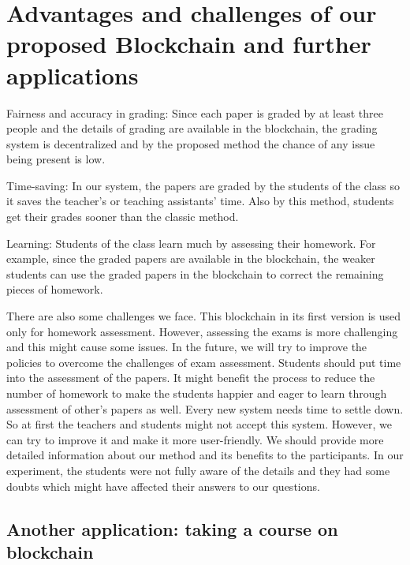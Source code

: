 \documentclass[manuscript,review,anonymous]{acmart}%
\begin{document}
\section{Advantages and challenges of our proposed Blockchain and further applications}

Fairness and accuracy in grading: Since each paper is graded by at least three people and the details of grading are available in the blockchain, the grading system is decentralized and by the proposed method the chance of any issue being present is low.

Time-saving: In our system, the papers are graded by the students of the class so it saves the teacher's or teaching assistants' time. Also by this method, students get their grades sooner than the classic method. 

Learning: Students of the class learn much by assessing their homework. For example, since the graded papers are available in the blockchain, the weaker students can use the graded papers in the blockchain to correct the remaining pieces of homework.

There are also some challenges we face. This blockchain in its first version is used only for homework assessment. However, assessing the exams is more challenging and this might cause some issues. In the future, we will try to improve the policies to overcome the challenges of exam assessment.
Students should put time into the assessment of the papers. It might benefit the process to reduce the number of homework to make the students happier and eager to learn through assessment of other's papers as well.
 Every new system needs time to settle down. So at first the teachers and students might not accept this system. However, we can try to improve it and make it more user-friendly. We should provide more detailed information about our method and its benefits to the participants. In our experiment, the students were not fully aware of the details and they had some doubts which might have affected their answers to our questions.



 \subsection{Another application: taking a course on blockchain}
 
\end{document}
